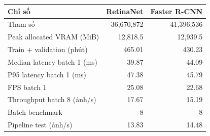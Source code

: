 \begin{tabular}{lrr}
\toprule
Chỉ số & RetinaNet & Faster R-CNN\\
\midrule
Tham số & 36,670,872 & 41,396,536\\
Peak allocated VRAM (MiB) & 12,818.5 & 12,939.5\\
Train + validation (phút) & 465.01 & 430.23\\
Median latency batch 1 (ms) & 39.87 & 44.09\\
P95 latency batch 1 (ms) & 47.38 & 45.79\\
FPS batch 1 & 25.08 & 22.68\\
Throughput batch 8 (ảnh/s) & 17.67 & 15.19\\
Batch benchmark & 8 & 8\\
Pipeline test (ảnh/s) & 13.83 & 14.48\\
\bottomrule
\end{tabular}
